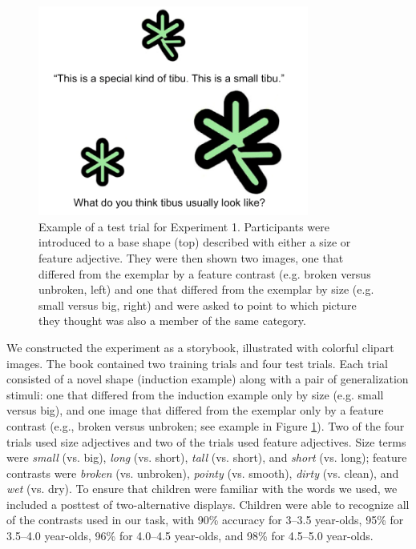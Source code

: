 \documentclass[man]{apa2}
\begin{document}
\begin{figure}[t]
  \begin{center} 
    \includegraphics[width=3.5in]{figures/inanimate_demo.png} 
    \caption{\label{fig:inanimate_demo} Example of a test trial for Experiment 1.  Participants were introduced to a base shape (top) described with either a size or feature adjective.  They were then shown two images, one that differed from the exemplar by a feature contrast (e.g. broken versus unbroken, left) and one that differed from the exemplar by size (e.g. small versus big, right) and were asked to point to which picture they thought was also a member of the same category. } 
  \end{center} 
\end{figure}	

We constructed the experiment as a storybook, illustrated with colorful clipart images. The book contained two training trials and four test trials. Each trial consisted of a novel shape (induction example) along with a pair of generalization stimuli: one that differed from the induction example only by size (e.g. small versus big), and one image that differed from the exemplar only by a feature contrast (e.g., broken versus unbroken; see example in Figure \ref{fig:inanimate_demo}). Two of the four trials used size adjectives and two of the trials used feature adjectives.
Size terms were \emph{small} (vs. big), \emph{long} (vs. short), \emph{tall} (vs. short), and \emph{short} (vs. long);  feature contrasts were \emph{broken} (vs. unbroken), \emph{pointy} (vs. smooth), \emph{dirty} (vs. clean), and \emph{wet} (vs. dry).  To ensure that children were familiar with the words we used, we included a posttest of two-alternative displays.  Children were able to recognize all of the contrasts used in our task, with 90\% accuracy for 3--3.5 year-olds, 95\% for 3.5--4.0 year-olds, 96\% for 4.0--4.5 year-olds, and 98\% for 4.5--5.0 year-olds.  
\end{document}
